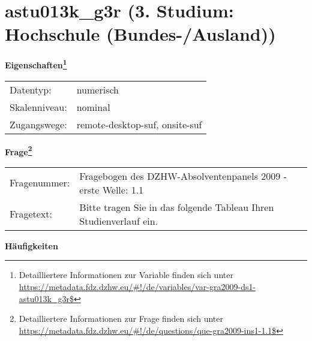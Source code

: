 
    \setcounter{footnote}{0}

    \vspace*{-1.8cm}
	\section{astu013k\_g3r (3. Studium: Hochschule (Bundes-/Ausland))}
	\label{section:astu013k_g3r}



    \vspace*{0.5cm}
    \noindent\textbf{Eigenschaften\footnote{Detailliertere Informationen zur Variable finden sich unter
		\url{https://metadata.fdz.dzhw.eu/\#!/de/variables/var-gra2009-ds1-astu013k_g3r$}}}\\
	\begin{tabularx}{\hsize}{@{}lX}
	Datentyp: & numerisch \\
	Skalenniveau: & nominal \\
	Zugangswege: &
	  remote-desktop-suf, 
	  onsite-suf
 \\
    \end{tabularx}



				\vspace*{0.5cm}
                \noindent\textbf{Frage\footnote{Detailliertere Informationen zur Frage finden sich unter
		              \url{https://metadata.fdz.dzhw.eu/\#!/de/questions/que-gra2009-ins1-1.1$}}}\\
				\begin{tabularx}{\hsize}{@{}lX}
					Fragenummer: &
					  Fragebogen des DZHW-Absolventenpanels 2009 - erste Welle:
					  1.1
 \\
					Fragetext: & Bitte tragen Sie in das folgende Tableau Ihren Studienverlauf ein. \\
				\end{tabularx}





        		\vspace*{0.5cm}
                \noindent\textbf{Häufigkeiten}

